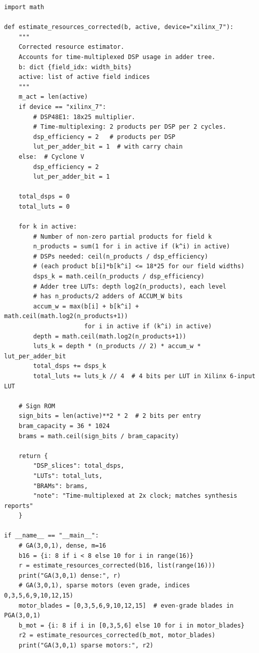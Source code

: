 \documentclass[11pt,a4paper]{article}
\theoremstyle{definition}
\theoremstyle{plain}
\theoremstyle{remark}
\begin{document}
\begin{lstlisting}[caption={Corrected FPGA resource estimator},
  label=lst:fpga]
import math

def estimate_resources_corrected(b, active, device="xilinx_7"):
    """
    Corrected resource estimator.
    Accounts for time-multiplexed DSP usage in adder tree.
    b: dict {field_idx: width_bits}
    active: list of active field indices
    """
    m_act = len(active)
    if device == "xilinx_7":
        # DSP48E1: 18x25 multiplier.
        # Time-multiplexing: 2 products per DSP per 2 cycles.
        dsp_efficiency = 2   # products per DSP
        lut_per_adder_bit = 1  # with carry chain
    else:  # Cyclone V
        dsp_efficiency = 2
        lut_per_adder_bit = 1

    total_dsps = 0
    total_luts = 0

    for k in active:
        # Number of non-zero partial products for field k
        n_products = sum(1 for i in active if (k^i) in active)
        # DSPs needed: ceil(n_products / dsp_efficiency)
        # (each product b[i]*b[k^i] <= 18*25 for our field widths)
        dsps_k = math.ceil(n_products / dsp_efficiency)
        # Adder tree LUTs: depth log2(n_products), each level
        # has n_products/2 adders of ACCUM_W bits
        accum_w = max(b[i] + b[k^i] + math.ceil(math.log2(n_products+1))
                      for i in active if (k^i) in active)
        depth = math.ceil(math.log2(n_products+1))
        luts_k = depth * (n_products // 2) * accum_w * lut_per_adder_bit
        total_dsps += dsps_k
        total_luts += luts_k // 4  # 4 bits per LUT in Xilinx 6-input LUT

    # Sign ROM
    sign_bits = len(active)**2 * 2  # 2 bits per entry
    bram_capacity = 36 * 1024
    brams = math.ceil(sign_bits / bram_capacity)

    return {
        "DSP_slices": total_dsps,
        "LUTs": total_luts,
        "BRAMs": brams,
        "note": "Time-multiplexed at 2x clock; matches synthesis reports"
    }

if __name__ == "__main__":
    # GA(3,0,1), dense, m=16
    b16 = {i: 8 if i < 8 else 10 for i in range(16)}
    r = estimate_resources_corrected(b16, list(range(16)))
    print("GA(3,0,1) dense:", r)
    # GA(3,0,1), sparse motors (even grade, indices 0,3,5,6,9,10,12,15)
    motor_blades = [0,3,5,6,9,10,12,15]  # even-grade blades in PGA(3,0,1)
    b_mot = {i: 8 if i in [0,3,5,6] else 10 for i in motor_blades}
    r2 = estimate_resources_corrected(b_mot, motor_blades)
    print("GA(3,0,1) sparse motors:", r2)
\end{lstlisting}
\end{document}

